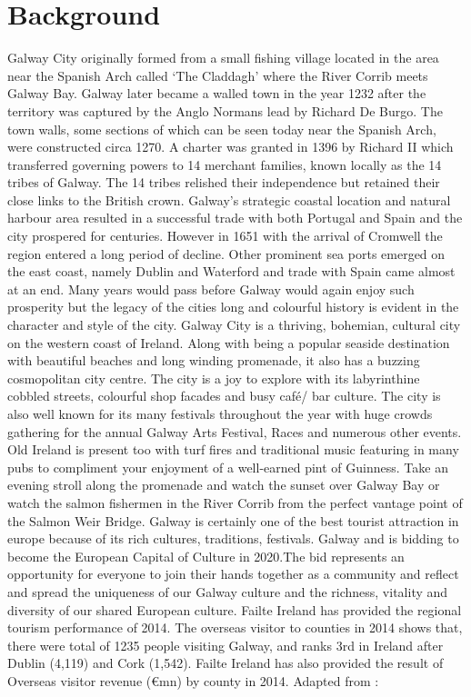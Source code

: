 \chapter{Background}
 \cite{galwayTourism} Galway City originally formed from a small fishing village located in the area near the Spanish Arch called ‘The Claddagh’ where the River Corrib meets Galway Bay. Galway later became a walled town in the year 1232 after the territory was captured by the Anglo Normans lead by Richard De Burgo. The town walls, some sections of which can be seen today near the Spanish Arch, were constructed circa 1270. A charter was granted in 1396 by Richard II which transferred governing powers to 14 merchant families, known locally as the 14 tribes of Galway. 
 The 14 tribes relished their independence but retained their close links to the British crown. Galway's strategic coastal location and natural harbour area resulted in a successful trade with both Portugal and Spain and the city prospered for centuries. However in 1651 with the arrival of Cromwell the region entered a long period of decline. Other prominent sea ports emerged on the east coast, namely Dublin and Waterford and trade with Spain came almost at an end. Many years would pass before Galway would again enjoy such prosperity but the legacy of the cities long and colourful history is evident in the character and style of the city. 
 Galway City is a thriving, bohemian, cultural city on the western coast of Ireland. Along with being a popular seaside destination with beautiful beaches and long winding promenade, it also has a buzzing cosmopolitan city centre. The city is a joy to explore with its labyrinthine cobbled streets, colourful shop facades and busy café/ bar culture.  The city is also well known for its many festivals throughout the year with huge crowds gathering for the annual Galway Arts Festival, Races and numerous other events. Old Ireland is present too with turf fires and traditional music featuring in many pubs to compliment your enjoyment of a well-earned pint of Guinness. Take an evening stroll along the promenade and watch the sunset over Galway Bay or watch the salmon fishermen in the River Corrib from the perfect vantage point of the Salmon Weir Bridge.
\cite{galway20} Galway is certainly one of the best tourist attraction in europe because of its rich cultures, traditions, festivals. Galway  and is bidding to become the European Capital of Culture in 2020.The bid represents an opportunity for everyone to join their hands together as a community and reflect and spread the uniqueness of our Galway culture and the richness, vitality and diversity of our shared European culture. \cite{failteireland}Failte Ireland has provided the regional tourism performance of 2014.  The overseas visitor to counties in 2014 shows that, there were total of 1235 people visiting Galway, and ranks 3rd in Ireland after Dublin (4,119) and Cork (1,542). Failte Ireland  has also provided the result of Overseas visitor revenue  (€mn) by county in 2014.  Adapted from : 

